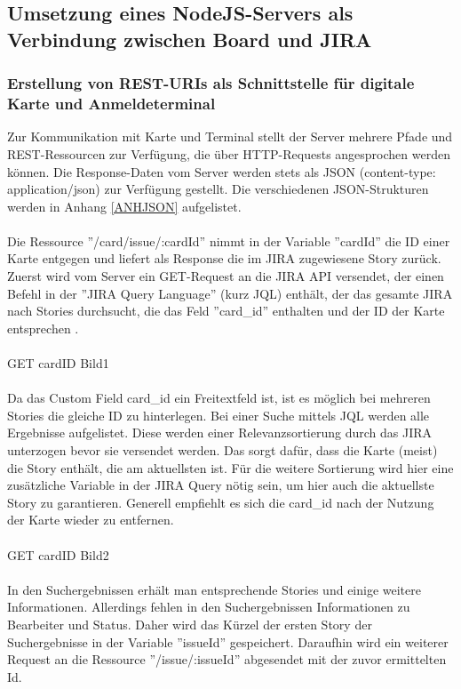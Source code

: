 \documentclass[12pt,titlepage]{scrartcl}
\begin{document}
		\subsection{Umsetzung eines NodeJS-Servers als Verbindung zwischen Board und JIRA} \label{implServer}
			\subsubsection{Erstellung von REST-URIs als Schnittstelle für digitale Karte und Anmeldeterminal} \label{ressourcenServer}
			Zur Kommunikation mit Karte und Terminal stellt der Server mehrere Pfade und REST-Ressourcen zur Verfügung, die über HTTP-Requests angesprochen werden können. Die Response-Daten vom Server werden stets als JSON (content-type: application/json) zur Verfügung gestellt. Die verschiedenen JSON-Strukturen werden in Anhang \ref{ANHJSON} aufgelistet. \\ \\
			Die Ressource ''/card/issue/:cardId'' nimmt in der Variable ''cardId'' die ID einer Karte entgegen und liefert als Response die im JIRA zugewiesene Story zurück. Zuerst wird vom Server ein GET-Request an die JIRA API versendet, der einen Befehl in der ''JIRA Query Language'' (kurz JQL) enthält, der das gesamte JIRA nach Stories durchsucht, die das Feld ''card\_id'' enthalten und der ID der Karte entsprechen \cite{jql}. \\ \\
			GET cardID Bild1 \\ \\
			Da das Custom Field card\_id ein Freitextfeld ist, ist es möglich bei mehreren Stories die gleiche ID zu hinterlegen. Bei einer Suche mittels JQL werden alle Ergebnisse aufgelistet. Diese werden einer Relevanzsortierung durch das JIRA unterzogen bevor sie versendet werden. Das sorgt dafür, dass die Karte (meist) die Story enthält, die am aktuellsten ist. Für die weitere Sortierung wird hier eine zusätzliche Variable in der JIRA Query nötig sein, um hier auch die aktuellste Story zu garantieren. Generell empfiehlt es sich die card\_id nach der Nutzung der Karte wieder zu entfernen. \\ \\
			GET cardID Bild2 \\ \\
			In den Suchergebnissen erhält man entsprechende Stories und einige weitere Informationen. Allerdings fehlen in den Suchergebnissen Informationen zu Bearbeiter und Status. Daher wird das Kürzel der ersten Story der Suchergebnisse in der Variable ''issueId'' gespeichert. Daraufhin wird ein weiterer Request an die Ressource ''/issue/:issueId'' abgesendet mit der zuvor ermittelten Id. \\ \\
\end{document}
